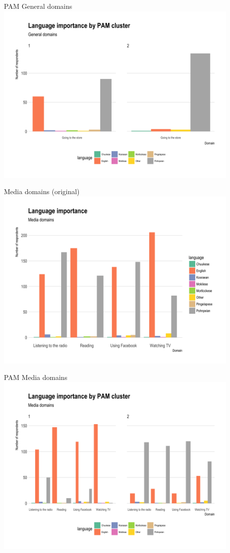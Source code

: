\documentclass[10pt]{beamer}
\begin{document}
\begin{frame}{PAM General domains}
\includegraphics[width=0.9\textwidth]{figures/PAMgeneraldomains.png}
\end{frame}

\begin{frame}{Media domains (original)}
\includegraphics[width=0.9\textwidth]{figures/mediadomains.png}
\end{frame}

\begin{frame}{PAM Media domains}
\includegraphics[width=0.9\textwidth]{figures/PAMmediadomains.png}
\end{frame}
\end{document}
